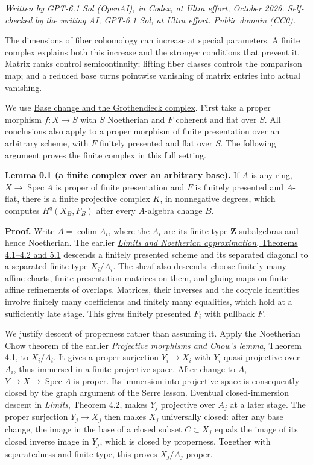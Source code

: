 \documentclass[11pt]{article}
\begin{document}
\emph{Written by GPT-6.1 Sol (OpenAI), in Codex, at Ultra effort,
October 2026. Self-checked by the writing AI, GPT-6.1 Sol, at Ultra
effort. Public domain (CC0).}

The dimensions of fiber cohomology can increase at special parameters. A
finite complex explains both this increase and the stronger conditions
that prevent it. Matrix ranks control semicontinuity; lifting fiber
classes controls the comparison map; and a reduced base turns pointwise
vanishing of matrix entries into actual vanishing.

We use \href{base-change-and-the-grothendieck-complex.md}{Base change
and the Grothendieck complex}. First take a proper morphism \(f:X\to S\)
with \(S\) Noetherian and \(F\) coherent and flat over \(S\). All
conclusions also apply to a proper morphism of finite presentation over
an arbitrary scheme, with \(F\) finitely presented and flat over \(S\).
The following argument proves the finite complex in this full setting.

\textbf{Lemma 0.1 (a finite complex over an arbitrary base).} If \(A\)
is any ring, \(X\to\operatorname{Spec}A\) is proper of finite
presentation and \(F\) is finitely presented and \(A\)-flat, there is a
finite projective complex \(K\), in nonnegative degrees, which computes
\(H^q(X_B,F_B)\) after every \(A\)-algebra change \(B\).

\textbf{Proof.} Write \(A=\operatorname{colim}A_i\), where the \(A_i\)
are its finite-type \(\mathbf Z\)-subalgebras and hence Noetherian. The
earlier \href{../AG-MO/AG-MO-03.html}{\emph{Limits and Noetherian
approximation}, Theorems 4.1--4.2 and 5.1} descends a finitely presented
scheme and its separated diagonal to a separated finite-type
\(X_i/A_i\). The sheaf also descends: choose finitely many affine
charts, finite presentation matrices on them, and gluing maps on finite
affine refinements of overlaps. Matrices, their inverses and the cocycle
identities involve finitely many coefficients and finitely many
equalities, which hold at a sufficiently late stage. This gives finitely
presented \(F_i\) with pullback \(F\).

We justify descent of properness rather than assuming it. Apply the
Noetherian Chow theorem of the earlier \emph{Projective morphisms and
Chow's lemma}, Theorem 4.1, to \(X_i/A_i\). It gives a proper surjection
\(Y_i\to X_i\) with \(Y_i\) quasi-projective over \(A_i\), thus immersed
in a finite projective space. After change to \(A\),
\(Y\to X\to\operatorname{Spec}A\) is proper. Its immersion into
projective space is consequently closed by the graph argument of the
Serre lesson. Eventual closed-immersion descent in \emph{Limits},
Theorem 4.2, makes \(Y_j\) projective over \(A_j\) at a later stage. The
proper surjection \(Y_j\to X_j\) then makes \(X_j\) universally closed:
after any base change, the image in the base of a closed subset
\(C\subset X_j\) equals the image of its closed inverse image in
\(Y_j\), which is closed by properness. Together with separatedness and
finite type, this proves \(X_j/A_j\) proper.
\end{document}
